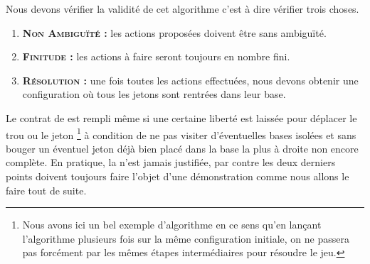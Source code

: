 \bigskip

Nous devons vérifier la validité de cet algorithme c'est à dire vérifier trois choses.

\begin{enumerate}
    \item \textbf{\textsc{Non Ambiguïté :}} les actions proposées doivent être sans ambiguïté.

    \item \textbf{\textsc{Finitude :}} les actions à faire seront toujours en nombre fini.

    \item \textbf{\textsc{Résolution :}} une fois toutes les actions effectuées, nous devons obtenir une configuration où tous les jetons sont rentrées dans leur base.
\end{enumerate}


Le contrat de  est rempli même si une certaine liberté est laissée pour déplacer le trou ou le jeton
\footnote{
    Nous avons ici un bel exemple d'algorithme  en ce sens qu'en lançant l'algorithme plusieurs fois sur la même configuration initiale, on ne passera pas forcément par les mêmes étapes intermédiaires pour résoudre le jeu.
}
à condition de ne pas visiter d'éventuelles bases isolées et sans bouger un éventuel jeton déjà bien placé dans la base la plus à droite non encore complète.
En pratique, la  n'est jamais justifiée, par contre les deux derniers points doivent toujours faire l'objet d'une  démonstration comme nous allons le faire tout de suite.

